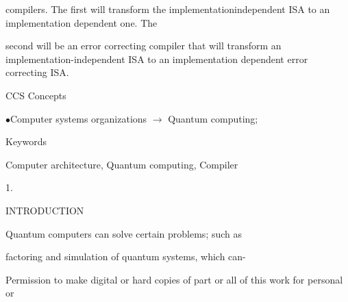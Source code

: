 \documentclass[a4paper,portrait,12pt]{article}
\begin{document}
\begin{flushleft}
compilers. The first will transform the implementationindependent ISA to an implementation dependent one. The
\end{flushleft}


\begin{flushleft}
second will be an error correcting compiler that will transform an implementation-independent ISA to an implementation dependent error correcting ISA.
\end{flushleft}





\begin{flushleft}
CCS Concepts
\end{flushleft}


\begin{flushleft}
$\bullet$Computer systems organizations $\rightarrow$ Quantum computing;
\end{flushleft}





\begin{flushleft}
Keywords
\end{flushleft}


\begin{flushleft}
Computer architecture, Quantum computing, Compiler
\end{flushleft}





1.





\begin{flushleft}
INTRODUCTION
\end{flushleft}





\begin{flushleft}
Quantum computers can solve certain problems; such as
\end{flushleft}


\begin{flushleft}
factoring and simulation of quantum systems, which can-
\end{flushleft}





\begin{flushleft}
Permission to make digital or hard copies of part or all of this work for personal or
\end{flushleft}
\end{document}
